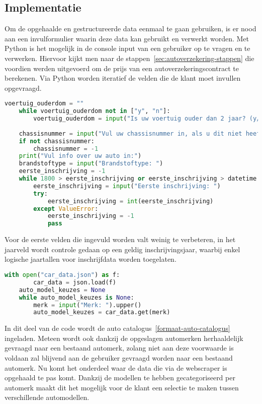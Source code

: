 \subsection{Implementatie}
Om de opgehaalde en gestructureerde data eenmaal te gaan gebruiken, is er nood aan een invulformulier waarin deze data kan gebruikt en verwerkt worden.
Met Python is het mogelijk in de console input van een gebruiker op te vragen en te verwerken.
Hiervoor kijkt men naar de stappen~\ref{sec:autoverzekering-stappen} die voordien werden uitgevoerd om de prijs van een autoverzekeringscontract te berekenen.
Via Python worden iteratief de velden die de klant moet invullen opgevraagd.
\begin{lstlisting}[language=Python, caption=Eerste velden autoverzekering digitaal invulformulier, breaklines=true, showstringspaces=false]
	voertuig_ouderdom = ""
	while voertuig_ouderdom not in ["y", "n"]:
		voertuig_ouderdom = input("Is uw voertuig ouder dan 2 jaar? (y/n) ")
	
	chassisnummer = input("Vul uw chassisnummer in, als u dit niet heeft, druk Enter ")
	if not chassisnummer:
		chassisnummer = -1
	print("Vul info over uw auto in:")
	brandstoftype = input("Brandstoftype: ")
	eerste_inschrijving = -1
	while 1800 > eerste_inschrijving or eerste_inschrijving > datetime.datetime.now().year:
		eerste_inschrijving = input("Eerste inschrijving: ")
		try:
			eerste_inschrijving = int(eerste_inschrijving)
		except ValueError:
			eerste_inschrijving = -1
			pass
\end{lstlisting}
Voor de eerste velden die ingevuld worden valt weinig te verbeteren, in het jaarveld wordt controle gedaan op een geldig inschrijvingsjaar, waarbij enkel logische jaartallen voor inschrijfdata worden toegelaten. 
\begin{lstlisting}[language=Python, caption=Python inladen data van auto catalogus, breaklines=true, showstringspaces=false]
	with open("car_data.json") as f:
		car_data = json.load(f)
	auto_model_keuzes = None
	while auto_model_keuzes is None:
		merk = input("Merk: ").upper()
		auto_model_keuzes = car_data.get(merk)
\end{lstlisting}
In dit deel van de code wordt de auto catalogus~\ref{formaat-auto-catalogus} ingeladen.
Meteen wordt ook dankzij de opgeslagen automerken herhaaldelijk gevraagd naar een bestaand automerk, zolang niet aan deze voorwaarde is voldaan zal blijvend aan de gebruiker gevraagd worden naar een bestaand automerk.
Nu komt het onderdeel waar de data die via de webscraper is opgehaald te pas komt.
Dankzij de modellen te hebben gecategoriseerd per automerk maakt dit het mogelijk voor de klant een selectie te maken tussen verschillende automodellen.
